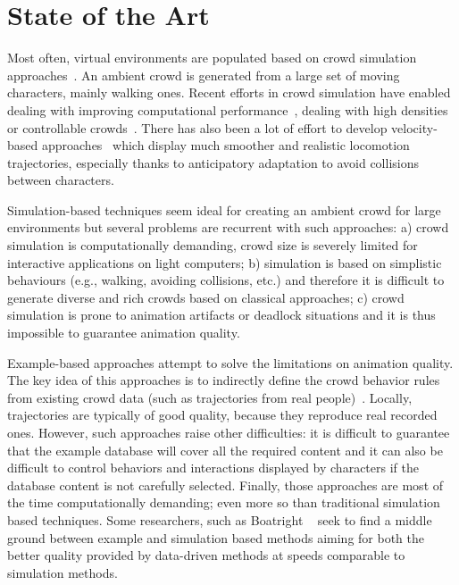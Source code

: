 \section{State of the Art}
\label{sec:star}

Most often, virtual environments are populated based on crowd simulation approaches~\cite{Reynolds87Flocks,Reynolds99Steering,ThalmannBook:2013}.
An ambient crowd is generated from a large set of moving characters, mainly walking ones.
Recent efforts in crowd simulation have enabled dealing with improving computational performance~\cite{PettreCAVW:2006,Treuille:2006}, dealing with high densities~\cite{Narain:2009} or controllable crowds~\cite{Guy:2009}.
There has also been a lot of effort to develop velocity-based approaches~\cite{Paris:2007,VanDenBerg:2008} which display much smoother and realistic locomotion trajectories, especially thanks to anticipatory adaptation to avoid collisions between characters.

Simulation-based techniques seem ideal for creating an ambient crowd for large environments but several problems are recurrent with such approaches:
a) crowd simulation is computationally demanding, crowd size is severely limited for interactive applications on light computers;
b) simulation is based on simplistic behaviours (e.g., walking, avoiding collisions, etc.) and therefore it is difficult to generate diverse and rich crowds based on classical approaches;
c) crowd simulation is prone to animation artifacts or deadlock situations and it is thus impossible to guarantee animation quality. 

Example-based approaches attempt to solve the limitations on animation quality.
The key idea of this approaches is to indirectly define the crowd behavior rules from existing crowd data (such as trajectories from real people)~\cite{Lerner:2007,Ju:2010,Charalambous:2014}.
Locally, trajectories are typically of good quality, because they reproduce real recorded ones.
However, such approaches raise other difficulties: it is difficult to guarantee that the example database will cover all the required content and it can also be difficult to control behaviors and interactions displayed by characters if the database content is not carefully selected.
Finally, those approaches are most of the time computationally demanding; even more so than traditional simulation based techniques.
Some researchers, such as Boatright \etal~\cite{Boatright2014Generating} seek to find a middle ground between example and simulation based methods aiming for both the better quality provided by data-driven methods at speeds comparable to simulation methods.

